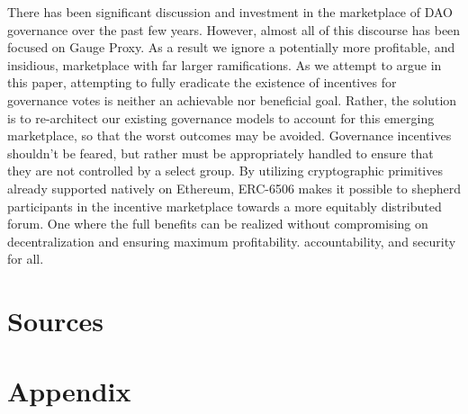 \documentclass{article}
\begin{document}
There has been significant discussion and investment in the marketplace of DAO governance over the past few years. However, almost all of this discourse has been focused on Gauge Proxy. As a result we ignore a potentially more profitable, and insidious, marketplace with far larger ramifications. As we attempt to argue in this paper, attempting to fully eradicate the existence of incentives for governance votes is neither an achievable nor beneficial goal. Rather, the solution is to re-architect our existing governance models to account for this emerging marketplace, so that the worst outcomes may be avoided. Governance incentives shouldn't be feared, but rather must be appropriately handled to ensure that they are not controlled by a select group. By utilizing cryptographic primitives already supported natively on Ethereum, ERC-6506 makes it possible to shepherd participants in the incentive marketplace towards a more equitably distributed forum. One where the full benefits can be realized without compromising on decentralization and ensuring maximum profitability. accountability, and security for all. 

\section{Sources}

\section{Appendix}

\newpage
\end{document}
